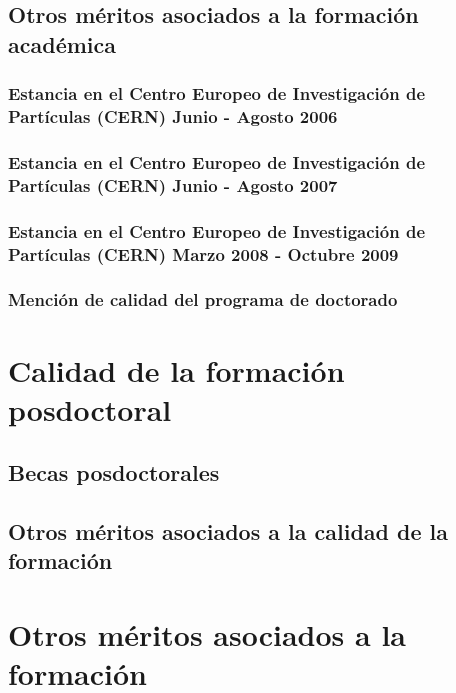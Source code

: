\documentclass[a4paper, 11pt, twoside, openright]{report}
\begin{document}
\subsection{Otros méritos asociados a la formación académica}

\subsubsection{Estancia en el Centro Europeo de Investigación de Partículas (CERN) Junio - Agosto 2006}


\subsubsection{Estancia en el Centro Europeo de Investigación de Partículas (CERN) Junio - Agosto 2007}


\subsubsection{Estancia en el Centro Europeo de Investigación de Partículas (CERN) Marzo 2008 - Octubre 2009}


\subsubsection{Mención de calidad del programa de doctorado}


\section{Calidad de la formación posdoctoral}

\subsection{Becas posdoctorales}

\subsection{Otros méritos asociados a la calidad de la formación}

\section{Otros méritos asociados a la formación}
	
\end{document}
